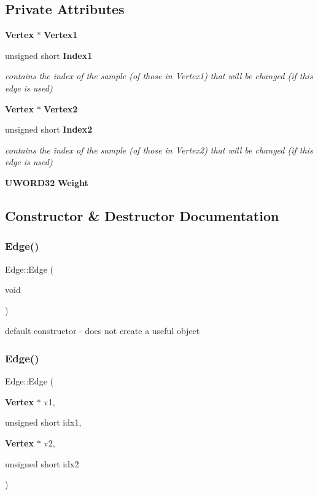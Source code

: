 \subsection*{Private Attributes}
\begin{DoxyCompactItemize}
\item 
\textbf{ Vertex} $\ast$ \textbf{ Vertex1}
\item 
unsigned short \textbf{ Index1}
\begin{DoxyCompactList}\small\item\em contains the index of the sample (of those in Vertex1) that will be changed (if this edge is used) \end{DoxyCompactList}\item 
\textbf{ Vertex} $\ast$ \textbf{ Vertex2}
\item 
unsigned short \textbf{ Index2}
\begin{DoxyCompactList}\small\item\em contains the index of the sample (of those in Vertex2) that will be changed (if this edge is used) \end{DoxyCompactList}\item 
\textbf{ U\+W\+O\+R\+D32} \textbf{ Weight}
\end{DoxyCompactItemize}


\subsection{Constructor \& Destructor Documentation}
\mbox{\label{classEdge_a45da6ae146df7547a4c7a86603e7a570}} 
\subsubsection{Edge()\hspace{0.1cm}{\footnotesize\ttfamily [1/3]}}
{\footnotesize\ttfamily Edge\+::\+Edge (\begin{DoxyParamCaption}\item[{void}]{ }\end{DoxyParamCaption})\hspace{0.3cm}{\ttfamily [inline]}}

default constructor -\/ does not create a useful object \mbox{\label{classEdge_a646d0b1057d6961de70dee774bdef3a4}} 
\subsubsection{Edge()\hspace{0.1cm}{\footnotesize\ttfamily [2/3]}}
{\footnotesize\ttfamily Edge\+::\+Edge (\begin{DoxyParamCaption}\item[{\textbf{ Vertex} $\ast$}]{v1,  }\item[{unsigned short}]{idx1,  }\item[{\textbf{ Vertex} $\ast$}]{v2,  }\item[{unsigned short}]{idx2 }\end{DoxyParamCaption})}

